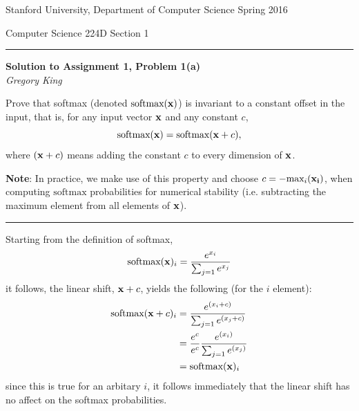 \documentclass[letter,12pt]{article}
\newcommand{\myheader}[4]
{\vspace*{-0.5in}
\noindent
{#1} \hfill {#3}

\noindent
{#2} \hfill {#4}

\noindent
\rule[8pt]{\textwidth}{1pt}

\vspace{1ex} 
}  %
\newcommand{\myalgsheader}[0]
{\myheader{Stanford University, Department of Computer Science}
{Computer Science 224D}{Spring 2016}{Section 1}}
\newcommand{\myhwtitle}[3]
{\begin{center}
{\large {\bf Solution to Assignment {#1}, Problem {#2}}}\\
\medskip 
{\it {#3}} %
\end{center}}
\begin{document}
\myalgsheader

\pagestyle{plain}
\setcounter{page}{1}
\myhwtitle{1}{1(a)}{Gregory King}

\bigskip

 Prove that softmax (denoted $\textrm{softmax}({\bf x})$)
is invariant to a constant offset in the input, that is, for any input vector
$\bf x$ and any constant $c$,
\begin{equation}
\textrm{softmax}({\bf x}) = \textrm{softmax}({\bf x} + c),
\end{equation}
where $({\bf x} + c)$ means adding the constant $c$ to every dimension of ${\bf x}$.

{\bf Note}: In practice, we make use of this property and choose $c = -\textrm{max}_{i}({\bf x_i})$, when computing $\textrm{softmax}$ probabilities for numerical stability (i.e. subtracting the maximum element from all elements of ${\bf x}$).\vspace{5mm}

\noindent\rule{\textwidth}{0.4pt}\vspace{5mm}

\noindent Starting from the definition of softmax,
\begin{equation}
\textrm{softmax}({\bf x})_{i} = \frac{e^{x_{i}}}{\sum_{j=1}{e^{x_{j}}}}
\end{equation}
it follows, the linear shift, ${\bf x} + c$, yields the following (for the $i$ element):
\begin{align}
\textrm{softmax}({\bf x} + c)_{i} & = \frac{e^{(x_{i} + c)}}{\sum_{j=1}{e^{(x_{j} + c)}}}\\
                                                 & = \frac{e^{c}}{e^{c}}\frac{e^{(x_{i})}}{\sum_{j=1}{e^{(x_{j})}}}\\
                                                 & = \textrm{softmax}({\bf x})_{i}
\end{align}
since this is true for an arbitary $i$, it follows immediately that the linear shift has no affect on the softmax probabilities.


\end{document}
